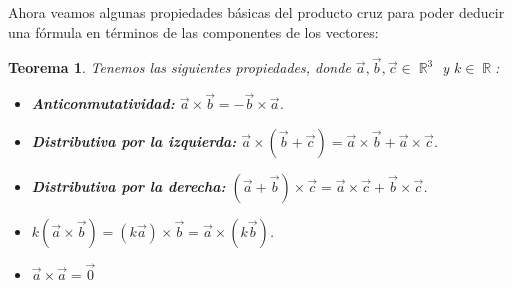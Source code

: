 \documentclass[12pt, fleqn]{report}                             %
\newtheorem{Theorem}{Teorema}[section]                          %
\theoremstyle{break}                                            %
\DeclareMathOperator \Reals        {\mathbb{R}}                 %
\newcommand{\Wrap}[1]{\left( #1 \right)}                        %
\begin{document}
            Ahora veamos algunas propiedades básicas del producto cruz para poder deducir una fórmula en términos de las componentes de los vectores:
            
            
            \begin{Theorem}
                Tenemos las siguientes propiedades, donde $\vec{a}, \vec{b}, \vec{c} \in \Reals^3$ y $k \in \Reals$:
                \begin{itemize}\setlength\itemsep{0em}
                    \item \textbf{Anticonmutatividad:} $\vec{a} \times \vec{b} = -\vec{b} \times \vec{a}$.
                    
                    \item \textbf{Distributiva por la izquierda:} $\vec{a} \times \Wrap{\vec{b}+\vec{c}} = \vec{a} \times \vec{b} + \vec{a} \times \vec{c}$.
                    
                    \item \textbf{Distributiva por la derecha:} $\Wrap{\vec{a}+\vec{b}} \times \vec{c} = \vec{a} \times \vec{c} + \vec{b} \times \vec{c}$.
                    
                    \item $k\Wrap{\vec{a} \times \vec{b}} = \Wrap{k \vec{a}} \times \vec{b} = \vec{a} \times \Wrap{k \vec{b}}$.
                    
                    \item $\vec{a} \times \vec{a} = \vec{0}$
                \end{itemize}
            \end{Theorem}
        
        
\end{document}
